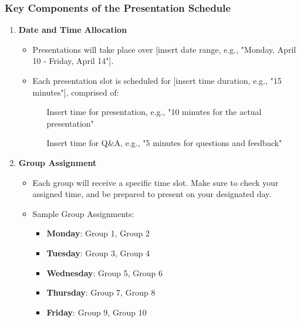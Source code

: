 \documentclass[aspectratio=169]{beamer}
\begin{document}
\begin{frame}[fragile]
    \frametitle{Key Components of the Presentation Schedule}
    \begin{enumerate}
        \item \textbf{Date and Time Allocation}
        \begin{itemize}
            \item Presentations will take place over [insert date range, e.g., "Monday, April 10 - Friday, April 14"].
            \item Each presentation slot is scheduled for [insert time duration, e.g., "15 minutes"], comprised of:
            \begin{itemize}
                \item [Insert time for presentation, e.g., "10 minutes for the actual presentation"]
                \item [Insert time for Q\&A, e.g., "5 minutes for questions and feedback"]
            \end{itemize}
        \end{itemize}

        \item \textbf{Group Assignment}
        \begin{itemize}
            \item Each group will receive a specific time slot. Make sure to check your assigned time, and be prepared to present on your designated day.
            \item Sample Group Assignments:
            \begin{itemize}
                \item \textbf{Monday}: Group 1, Group 2
                \item \textbf{Tuesday}: Group 3, Group 4
                \item \textbf{Wednesday}: Group 5, Group 6
                \item \textbf{Thursday}: Group 7, Group 8
                \item \textbf{Friday}: Group 9, Group 10
            \end{itemize}
        \end{itemize}
    \end{enumerate}
\end{frame}
\end{document}

